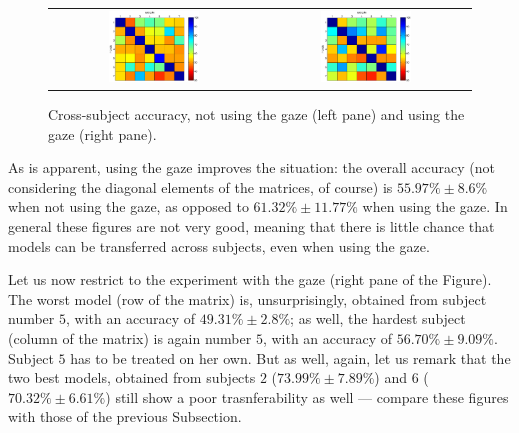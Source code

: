\documentclass[jou,a4paper,notxfonts]{apa}
\begin{document}
\begin{figure}[!ht]
  \centering
    \begin{tabular}{cc}
      \includegraphics[width=0.45\textwidth]{figs/cross_nogaze.eps} &
      \includegraphics[width=0.45\textwidth]{figs/cross_gaze.eps} \\
    \end{tabular}
    \caption{Cross-subject accuracy, not using the gaze (left pane)
    and using the gaze (right pane).}
    \label{fig:cross}
\end{figure}

As is apparent, using the gaze improves the situation: the overall
accuracy (not considering the diagonal elements of the matrices, of
course) is $55.97\% \pm 8.6\%$ when not using the gaze, as opposed to
$61.32\% \pm 11.77\%$ when using the gaze. In general these figures
are not very good, meaning that there is little chance that models can
be transferred across subjects, even when using the gaze.

Let us now restrict to the experiment with the gaze (right pane of the
Figure). The worst model (row of the matrix) is, unsurprisingly,
obtained from subject number $5$, with an accuracy of $49.31\% \pm
2.8\%$; as well, the hardest subject (column of the matrix) is again
number $5$, with an accuracy of $56.70\% \pm 9.09\%$. Subject $5$ has
to be treated on her own. But as well, again, let us remark that the
two best models, obtained from subjects $2$ ($73.99\% \pm 7.89\%$) and
$6$ ($70.32\% \pm 6.61\%$) still show a poor trasnferability as well
--- compare these figures with those of the previous Subsection.
\end{document}
